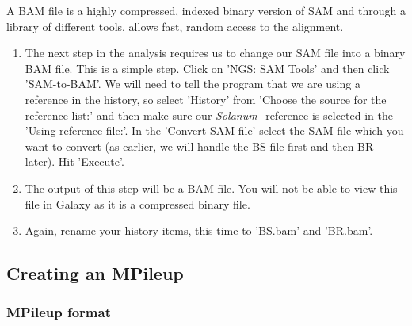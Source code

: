 \documentclass[12pt,a4paper]{article}
\begin{document}
A BAM file is a highly compressed, indexed binary version of SAM and
through a library of different tools, allows fast, random access to
the alignment.
\begin{enumerate}
	\item The next step in the analysis requires us to change our
          SAM file into a binary BAM file. This is a simple
          step. Click on 'NGS: SAM Tools' and then click
          'SAM-to-BAM'. We will need to tell the program that we are
          using a reference in the history, so select 'History' from
          'Choose the source for the reference list:' and then make
          sure our \emph{Solanum}\_reference is selected in the 'Using
          reference file:'. In the 'Convert SAM file' select the SAM
          file which you want to convert (as earlier, we will handle
          the BS file first and then BR later). Hit 'Execute'.
	\item The output of this step will be a BAM file. You will
          not be able to view this file in Galaxy as it is a
          compressed binary file.
	\item Again, rename your history items, this time to 'BS.bam'
          and 'BR.bam'.
\end{enumerate}

\subsection{Creating an MPileup}

\subsubsection{MPileup format}
\end{document}
